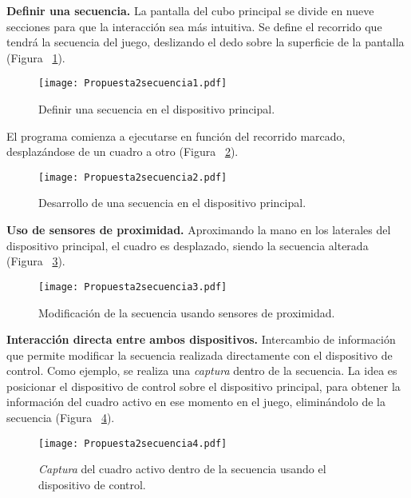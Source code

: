 \textbf{Definir una secuencia.} La pantalla del cubo principal se divide en nueve secciones para que la interacción sea más intuitiva. Se define el recorrido que tendrá la secuencia del juego, deslizando el dedo sobre la superficie de la pantalla (Figura ~\ref{fig:Secuencia1}).

\begin{figure}[!h]
\begin{center}
\texttt{[image: Propuesta2secuencia1.pdf]}
\caption{Definir una secuencia en el dispositivo principal.}
\label{fig:Secuencia1}
\end{center}
\end{figure}


El programa comienza a ejecutarse en función del recorrido marcado, desplazándose de un cuadro a otro (Figura ~\ref{fig:Secuencia2}). 
\begin{figure}[!h]
\begin{center}
\texttt{[image: Propuesta2secuencia2.pdf]}
\caption{Desarrollo de una secuencia en el dispositivo principal.}
\label{fig:Secuencia2}
\end{center}
\end{figure}

\textbf{Uso de sensores de proximidad.} Aproximando la mano en los laterales del dispositivo principal, el cuadro es desplazado, siendo la secuencia alterada (Figura ~\ref{fig:Secuencia3}).

\begin{figure}[!h]
\begin{center}
\texttt{[image: Propuesta2secuencia3.pdf]}
\caption{Modificación de la secuencia usando sensores de proximidad.}
\label{fig:Secuencia3}
\end{center}
\end{figure}


\textbf{Interacción directa entre ambos dispositivos.} Intercambio de información que permite modificar la secuencia realizada directamente con el dispositivo de control. Como ejemplo, se realiza una \emph{captura} dentro de la secuencia. La idea es posicionar el dispositivo de control sobre el dispositivo principal, para obtener la información del cuadro activo en ese momento en el juego, eliminándolo de la secuencia (Figura ~\ref{fig:Secuencia4}). 

\begin{figure}[!h]
\begin{center}
\texttt{[image: Propuesta2secuencia4.pdf]}
\caption{\emph{Captura} del cuadro activo dentro de la secuencia usando el dispositivo de control.}
\label{fig:Secuencia4}
\end{center}
\end{figure}

